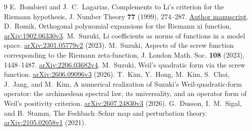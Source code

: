 \documentclass[11pt]{article}
\theoremstyle{remark}
\begin{document}
\begin{thebibliography}{9}
E.~Bombieri and J.~C.~Lagarias,
Complements to Li's criterion for the Riemann hypothesis,
J. Number Theory \textbf{77} (1999), 274--287.
\href{https://websites.umich.edu/~lagarias/doc/bombieri.pdf}
{Author manuscript}.
D.~Romik,
Orthogonal polynomial expansions for the Riemann xi function,
\href{https://arxiv.org/abs/1902.06330v3}{arXiv:1902.06330v3}.
M.~Suzuki,
Li coefficients as norms of functions in a model space.
\href{https://arxiv.org/abs/2301.05779v2}{arXiv:2301.05779v2} (2023).
M.~Suzuki,
Aspects of the screw function corresponding to the Riemann zeta-function,
J. London Math. Soc. \textbf{108} (2023), 1448--1487.
\href{https://arxiv.org/abs/2206.03682v4}{arXiv:2206.03682v4}.
M.~Suzuki,
Weil's quadratic form via the screw function.
\href{https://arxiv.org/abs/2606.09096v3}{arXiv:2606.09096v3} (2026).
T.~Kim, Y.~Hong, M.~Kim, S.~Choi, J.~Jang, and M.~Kim,
A numerical realization of Suzuki's Weil-quadratic-form operator:
the archimedean spectral law, its universality, and an operator form
of Weil's positivity criterion.
\href{https://arxiv.org/abs/2607.24830v3}{arXiv:2607.24830v3} (2026).
G.~Dusson, I.~M.~Sigal, and B.~Stamm,
The Feshbach--Schur map and perturbation theory.
\href{https://arxiv.org/abs/2105.02058v1}{arXiv:2105.02058v1} (2021).
\end{thebibliography}
\end{document}
